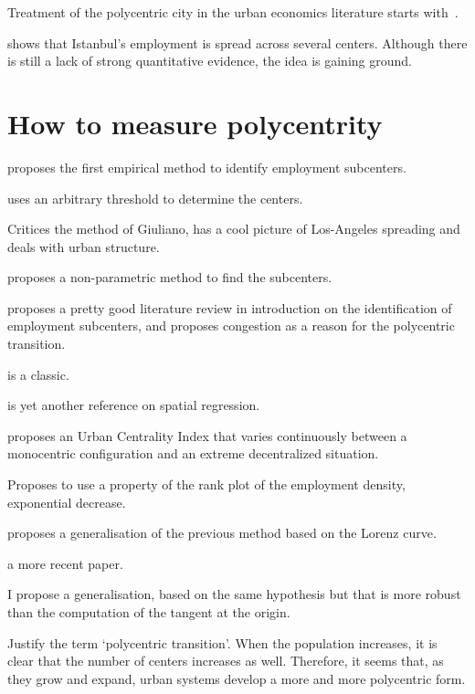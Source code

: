 Treatment of the polycentric city in the urban economics literature starts
with~\cite{Fujita:1982}.

\cite{Dokmeci:1994} shows that Istanbul's employment is spread across several
centers. Although there is still a lack of strong quantitative evidence, the
idea is gaining ground.



\section{How to measure polycentrity}
\label{sec:how_to_measure_polycentrity}

\cite{McDonald:1987} proposes the first empirical method to identify employment
subcenters.

\cite{Giuliano:1991} uses an arbitrary threshold to determine the centers.

\cite{Anas:1998} Critices the method of Giuliano, has a cool picture of
Los-Angeles spreading and deals with urban structure.

\cite{McMillen:2001} proposes a non-parametric method to find the subcenters.

\cite{McMillen:2003} proposes a pretty good literature review in introduction on
the identification of employment subcenters, and proposes congestion as a reason
for the polycentric transition.

\cite{Tsai:2005} is a classic.

\cite{Griffith:2007} is yet another reference on spatial regression.

\cite{Pereira:2013} proposes an Urban Centrality Index that varies continuously
between a monocentric configuration and an extreme decentralized situation.

\cite{Louf:2013_polycentric} Proposes to use a property of the rank plot of the
employment density, exponential decrease.

\cite{Louail:2014} proposes a generalisation of the previous method based on the
Lorenz curve.

\cite{LeNechet:2015} a more recent paper.

I propose a generalisation, based on the same hypothesis but that is more robust
than the computation of the tangent at the origin.


Justify the term `polycentric transition'. When the population increases, it is
clear that the number of centers increases as well. Therefore, it seems that, as
they grow and expand, urban systems develop a more and more polycentric form.
